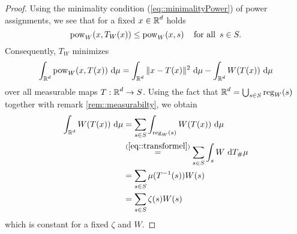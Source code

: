 \documentclass[
     12pt,         %
     a4paper,      %
     BCOR=10mm,     %
     DIV=14,        %
     ]{scrreprt}
\begin{document}
    \begin{proof}[Proof]
        Using the minimality condition (\ref{eq::minimalityPower}) of power assignments, we see that for a fixed $x\in \operatorname{\mathbb{R}}^d$ holds
        \[\pow_W(x,T_W(x)) \le \pow_W(x,s) \quad \forAll s\in S. \] 
        Consequently, $T_W$ minimizes 
        \[ \int_{\operatorname{\mathbb{R}}^d} \operatorname{pow}_W(x,T(x)) \ {\operatorname{{\mathrm{d}}}} \mu =  \int_{\operatorname{\mathbb{R}}^d} \| x - T(x) \|^2 \ {\operatorname{{\mathrm{d}}}} \mu - \int_{\operatorname{\mathbb{R}}^d} W(T(x)) \ {\operatorname{{\mathrm{d}}}} \mu \]
        over all measurable maps $T:\operatorname{\mathbb{R}}^d \to S$. Using the fact that $\operatorname{\mathbb{R}}^d = \bigcup_{s\in S} \operatorname{reg}_W(s)$ together with remark \ref{rem::measurabilty}, we obtain
        \begin{align*} 
            \int_{\operatorname{\mathbb{R}}^d} W(T(x)) \ {\operatorname{{\mathrm{d}}}} \mu &= \sum_{s\in S} \int_{\operatorname{reg}_W(s)} W(T(x)) \ {\operatorname{{\mathrm{d}}}} \mu \\ 
                                                 &\overset {(\ref{eq::transformel})}= \sum_{s\in S} \int_{s} W \ {\operatorname{{\mathrm{d}}}} T_{\#}\mu \\
                                                 &= \sum_{s\in S} \mu(T^{-1}(s))W(s) \\
                                                 &= \sum_{s\in S} \zeta(s)W(s) 
        \end{align*}
        which is constant for a fixed $\zeta$ and $W$.
    \end{proof}
\end{document}
